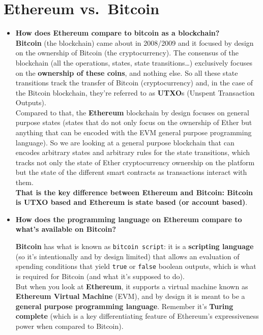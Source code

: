 \section{Ethereum vs.~Bitcoin}\label{ethereum-vs.-bitcoin}

\begin{itemize}
\item
  \textbf{How does Ethereum compare to bitcoin as a blockchain?}\\

  \textbf{Bitcoin} (the blockchain) came about in 2008/2009 and it
  focused by design on the ownership of Bitcoin (the cryptocurrency).
  The consensus of the blockchain (all the operations, states, state
  transitions\ldots) exclusively focuses on the \textbf{ownership of
  these coins}, and nothing else. So all these state transitions track
  the transfer of Bitcoin (cryptocurrency) and, in the case of the
  Bitcoin blockchain, they're referred to as \textbf{UTXO}s (Unspent
  Transaction Outputs).\\

  Compared to that, the \textbf{Ethereum} blockchain by design focuses
  on general purpose states (states that do not only focus on the
  ownership of Ether but anything that can be encoded with the EVM
  general purpose programming language). So we are looking at a general
  purpose blockchain that can encodes arbitrary states and arbitrary
  rules for the state transitions, which tracks not only the state of
  Ether cryptocurrency ownership on the platform but the state of the
  different smart contracts as transactions interact with them.\\

  \textbf{That is the key difference between Ethereum and Bitcoin:
  Bitcoin is UTXO based and Ethereum is state based (or account
  based)}.\\
\item
  \textbf{How does the programming language on Ethereum compare to
  what's available on Bitcoin?}

  \textbf{Bitcoin} has what is known as \texttt{bitcoin\ script}: it is
  a \textbf{scripting language} (so it's intentionally and by design
  limited) that allows an evaluation of spending conditions that yield
  \texttt{true} or \texttt{false} boolean outputs, which is what is
  required for Bitcoin (and what it's supposed to do).\\

  But when you look at \textbf{Ethereum}, it supports a virtual machine
  known as \textbf{Ethereum Virtual Machine} (EVM), and by design it is
  meant to be a \textbf{general purpose programming language}. Remember
  it's \textbf{Turing complete} (which is a key differentiating feature
  of Ethereum's expressiveness power when compared to Bitcoin).
\end{itemize}
